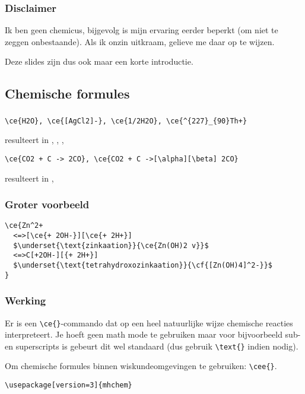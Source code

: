 \begin{frame}
  \frametitle{Disclaimer}

  Ik ben geen chemicus, bijgevolg is mijn ervaring eerder beperkt (om niet te zeggen onbestaande). Als ik onzin uitkraam, gelieve me daar op te wijzen.

  Deze slides zijn dus ook maar een korte introductie.
\end{frame}

\subsection{Chemische formules}
\begin{frame}[fragile]
  \frametitle{}

  \begin{verbatim}
\ce{H2O}, \ce{[AgCl2]-}, \ce{1/2H2O}, \ce{^{227}_{90}Th+}
  \end{verbatim}
  resulteert in , \ce{[AgCl2]-}, , 
  \begin{verbatim}
\ce{CO2 + C -> 2CO}, \ce{CO2 + C ->[\alpha][\beta] 2CO}
  \end{verbatim}
  resulteert in , 
\end{frame}

\begin{frame}[fragile]
  \frametitle{Groter voorbeeld}

  \small
  \begin{verbatim}
\ce{Zn^2+
  <=>[\ce{+ 2OH-}][\ce{+ 2H+}]
  $\underset{\text{zinkaation}}{\ce{Zn(OH)2 v}}$
  <=>C[+2OH-][{+ 2H+}]
  $\underset{\text{tetrahydroxozinkaation}}{\cf{[Zn(OH)4]^2-}}$
}
  \end{verbatim}
  \normalsize
{}
\end{frame}

\begin{frame}[fragile]
  \frametitle{Werking}

  Er is een \texttt{\textcolor{uagreen}{\textbackslash ce}\{\}}-commando dat op een heel natuurlijke wijze chemische reacties interpreteert. Je hoeft geen math mode te gebruiken maar voor bijvoorbeeld sub- en superscripts is gebeurt dit wel standaard (dus gebruik \texttt{\textcolor{uagreen}{\textbackslash text}\{\}} indien nodig).

  Om chemische formules binnen wiskundeomgevingen te gebruiken: \texttt{\textcolor{uagreen}{\textbackslash cee}\{\}}.

  \begin{verbatim}
\usepackage[version=3]{mhchem}
  \end{verbatim}
\end{frame}


